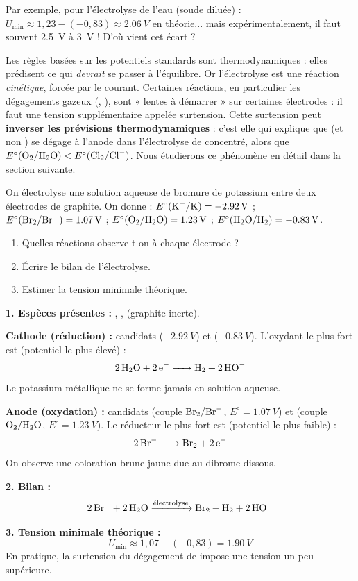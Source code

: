 \documentclass[11pt]{article}
\newcommand{\cle}[1]{{\popxbold\color{popdark}#1}}
\begin{document}
Par exemple, pour l'électrolyse de l'eau (soude diluée) : $U_{\text{min}} \approx 1{,}23 - (-0{,}83) \approx \SI{2,06}{V}$ en théorie... mais expérimentalement, il faut souvent \SI{2,5}{V} à \SI{3}{V} ! D'où vient cet écart ?

\begin{attention}
Les règles basées sur les potentiels standards sont thermodynamiques : elles prédisent ce qui \emph{devrait} se passer à l'équilibre. Or l'électrolyse est une réaction \emph{cinétique}, forcée par le courant. Certaines réactions, en particulier les dégagements gazeux (, ), sont « lentes à démarrer » sur certaines électrodes : il faut une tension supplémentaire appelée \cle{surtension}. Cette surtension peut \textbf{inverser les prévisions thermodynamiques} : c'est elle qui explique que  (et non ) se dégage à l'anode dans l'électrolyse de  concentré, alors que $E^{\circ}(\ce{O2}/\ce{H2O}) < E^{\circ}(\ce{Cl2}/\ce{Cl-})$. Nous étudierons ce phénomène en détail dans la section suivante.
\end{attention}

\begin{exoresolu}
On électrolyse une solution aqueuse de bromure de potassium  entre deux électrodes de graphite. On donne : $E^{\circ}(\ce{K+}/\ce{K}) = \SI{-2,92}{V}$ ; $E^{\circ}(\ce{Br2}/\ce{Br-}) = \SI{+1,07}{V}$ ; $E^{\circ}(\ce{O2}/\ce{H2O}) = \SI{+1,23}{V}$ ; $E^{\circ}(\ce{H2O}/\ce{H2}) = \SI{-0,83}{V}$.
\begin{enumerate}
\item Quelles réactions observe-t-on à chaque électrode ?
\item Écrire le bilan de l'électrolyse.
\item Estimer la tension minimale théorique.
\end{enumerate}
\tcblower
\textbf{1. Espèces présentes :} , ,  (graphite inerte).

\textbf{Cathode (réduction) :} candidats  ($\SI{-2,92}{V}$) et  ($\SI{-0,83}{V}$). L'oxydant le plus fort est  (potentiel le plus élevé) :
\[ \ce{2 H2O + 2 e- -> H2 + 2 HO-} \]
Le potassium métallique ne se forme jamais en solution aqueuse.

\textbf{Anode (oxydation) :} candidats  (couple $\ce{Br2}/\ce{Br-}$, $E^{\circ}=\SI{+1,07}{V}$) et  (couple $\ce{O2}/\ce{H2O}$, $E^{\circ}=\SI{+1,23}{V}$). Le réducteur le plus fort est  (potentiel le plus faible) :
\[ \ce{2 Br- -> Br2 + 2 e-} \]
On observe une coloration brune-jaune due au dibrome dissous.

\textbf{2. Bilan :}
\[ \ce{2 Br- + 2 H2O ->[\text{électrolyse}] Br2 + H2 + 2 HO-} \]

\textbf{3. Tension minimale théorique :}
\[ U_{\text{min}} \approx 1{,}07 - (-0{,}83) = \SI{1,90}{V} \]
En pratique, la surtension du dégagement de  impose une tension un peu supérieure.
\end{exoresolu}
\end{document}
